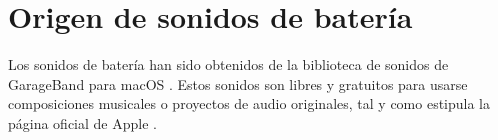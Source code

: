 
    \section{Origen de sonidos de batería} %
    \label{sec:OrigenDeSonidosDeBateria}

        Los sonidos de batería han sido obtenidos de la biblioteca de sonidos de GarageBand para macOS \cite{garageband}.
        Estos sonidos son libres y gratuitos para usarse composiciones musicales o proyectos de audio originales, tal y
        como estipula la página oficial de Apple \cite{support_garageband}.



\newpage
